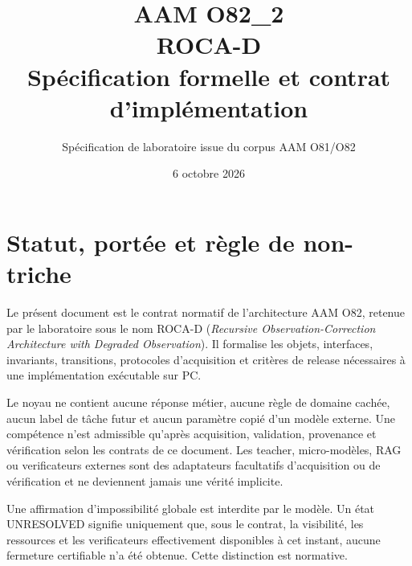 \documentclass[11pt,a4paper]{report}
\title{AAM O82\_2\\ROCA-D\\Spécification formelle et contrat d'implémentation}
\author{Spécification de laboratoire issue du corpus AAM O81/O82}
\date{6 octobre 2026}
\begin{document}
\setlength{\emergencystretch}{2em}
\maketitle
\tableofcontents

\chapter*{Statut, portée et règle de non-triche}
Le présent document est le contrat normatif de l'architecture AAM O82, retenue par le laboratoire sous le nom ROCA-D (\emph{Recursive Observation-Correction Architecture with Degraded Observation}). Il formalise les objets, interfaces, invariants, transitions, protocoles d'acquisition et critères de release nécessaires à une implémentation exécutable sur PC.

Le noyau ne contient aucune réponse métier, aucune règle de domaine cachée, aucun label de tâche futur et aucun paramètre copié d'un modèle externe. Une compétence n'est admissible qu'après acquisition, validation, provenance et vérification selon les contrats de ce document. Les teacher, micro-modèles, RAG ou verificateurs externes sont des adaptateurs facultatifs d'acquisition ou de vérification et ne deviennent jamais une vérité implicite.

Une affirmation d'impossibilité globale est interdite par le modèle. Un état UNRESOLVED signifie uniquement que, sous le contrat, la visibilité, les ressources et les verificateurs effectivement disponibles à cet instant, aucune fermeture certifiable n'a été obtenue. Cette distinction est normative.
\end{document}
